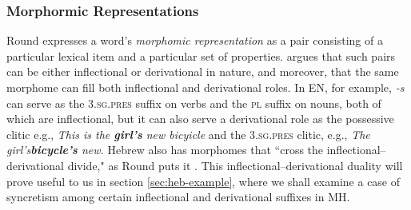
\subsubsection{Morphormic Representations}
Round expresses a word's \emph{morphomic representation} as a pair 
consisting of a particular lexical item and a particular set of properties.
\cite{round:2011} argues that such pairs can be either inflectional 
 or derivational in nature, and moreover, that the same morphome can fill 
 both inflectional and derivational roles. In \ac{EN}, for example, \emph{-s} 
 can serve as the \textsc{3.sg.pres} suffix on verbs and the \textsc{pl} 
 suffix on nouns, both of which are inflectional, but it can also serve a derivational 
 role as the possessive clitic e.g., \emph{This is the \textbf{girl's} new bicyicle} and 
 the \textsc{3.sg.pres} clitic, e.g., \emph{The girl's\textbf{bicycle's} new.} 
 Hebrew also has morphomes that ``cross the inflectional--derivational divide," 
 as Round puts it \citep[][p.14]{round:2015}. This inflectional--derivational 
 duality will prove useful to us in section \ref{sec:heb-example}, where we shall 
 examine a case of syncretism among certain inflectional and derivational suffixes in \ac{MH}.

% 
  
